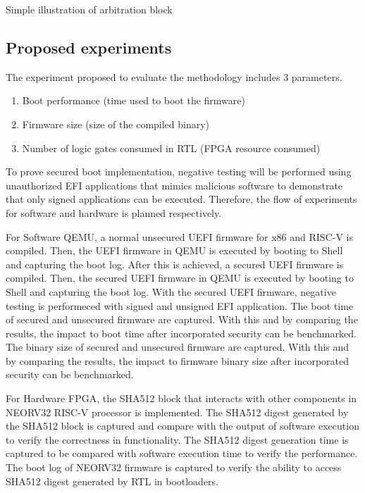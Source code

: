 \documentclass[]{rsos}%
\begin{document}
\begin{algorithm}
 \caption{Simple illustration of arbitration block}

\end{algorithm}

\subsection{ Proposed experiments}
The experiment proposed to evaluate the methodology includes 3 parameters.
\begin{enumerate}
\itemsep=-1pt 		%
\itemindent=0pt 	%
\item 
Boot performance (time used to boot the firmware)
\item 
Firmware size (size of the compiled binary)
\item 
Number of logic gates consumed in RTL (FPGA resource consumed)
\end{enumerate}

To prove secured boot implementation, negative testing will be performed using unauthorized EFI applications that mimics malicious software to demonstrate that only signed applications can be executed. Therefore, the flow of experiments for software and hardware is planned respectively.

For Software QEMU, a normal unsecured UEFI firmware for x86 and RISC-V is compiled. Then, the UEFI firmware in QEMU is executed by booting to Shell and capturing the boot log.
After this is achieved, a secured UEFI firmware is compiled. Then, the secured UEFI firmware in QEMU is executed by booting to Shell and capturing the boot log.
With the secured UEFI firmware, negative testing is performeced with signed and unsigned EFI application.
The boot time of secured and unsecured firmware are captured. With this and by comparing the results, the impact to boot time after incorporated security can be benchmarked.
The binary size of secured and unsecured firmware are captured. With this and by comparing the results, the impact to firmware binary size after incorporated security can be benchmarked.

For Hardware FPGA, the SHA512 block that interacts with other components in NEORV32 RISC-V processor is implemented.
The SHA512 digest generated by the SHA512 block is captured and compare with the output of software execution to verify the correctness in functionality.
The SHA512 digest generation time is captured to be compared with software execution time to verify the performance.
The boot log of NEORV32 firmware is captured to verify the ability to access SHA512 digest generated by RTL in bootloaders.
\end{document}
